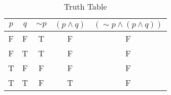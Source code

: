 \begin{table}[ht]
\caption{Truth Table}
\centering
\begin{tabular}{|c|c||c|c|c|}
\hline
$ p $ & $ q $ & $  \sim p $ & $ (p \wedge q) $ & $ ( \sim p \wedge (p \wedge q)) $ \\
\hline
F & F & T & F & F \\
F & T & T & F & F \\
T & F & F & F & F \\
T & T & F & T & F \\
\hline
\end{tabular}
\label{table:tt1}
\end{table}

